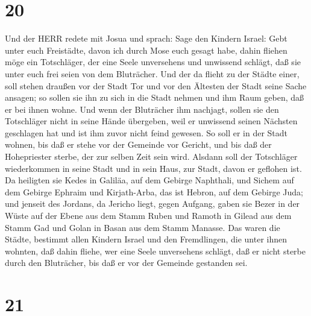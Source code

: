 \hypertarget{section-19}{%
\section{20}\label{section-19}}

 Und der HERR redete mit Josua und sprach:  Sage
den Kindern Israel: Gebt unter euch Freistädte, davon ich durch Mose
euch gesagt habe,  dahin fliehen möge ein Totschläger, der
eine Seele unversehens und unwissend schlägt, daß sie unter euch frei
seien von dem Bluträcher.  Und der da flieht zu der Städte
einer, soll stehen draußen vor der Stadt Tor und vor den Ältesten der
Stadt seine Sache ansagen; so sollen sie ihn zu sich in die Stadt nehmen
und ihm Raum geben, daß er bei ihnen wohne.  Und wenn der
Bluträcher ihm nachjagt, sollen sie den Totschläger nicht in seine Hände
übergeben, weil er unwissend seinen Nächsten geschlagen hat und ist ihm
zuvor nicht feind gewesen.  So soll er in der Stadt wohnen,
bis daß er stehe vor der Gemeinde vor Gericht, und bis daß der
Hohepriester sterbe, der zur selben Zeit sein wird. Alsdann soll der
Totschläger wiederkommen in seine Stadt und in sein Haus, zur Stadt,
davon er geflohen ist.  Da heiligten sie Kedes in Galiläa,
auf dem Gebirge Naphthali, und Sichem auf dem Gebirge Ephraim und
Kirjath-Arba, das ist Hebron, auf dem Gebirge Juda;  und
jenseit des Jordans, da Jericho liegt, gegen Aufgang, gaben sie Bezer in
der Wüste auf der Ebene aus dem Stamm Ruben und Ramoth in Gilead aus dem
Stamm Gad und Golan in Basan aus dem Stamm Manasse.  Das
waren die Städte, bestimmt allen Kindern Israel und den Fremdlingen, die
unter ihnen wohnten, daß dahin fliehe, wer eine Seele unversehens
schlägt, daß er nicht sterbe durch den Bluträcher, bis daß er vor der
Gemeinde gestanden sei.

\hypertarget{section-20}{%
\section{21}\label{section-20}}

